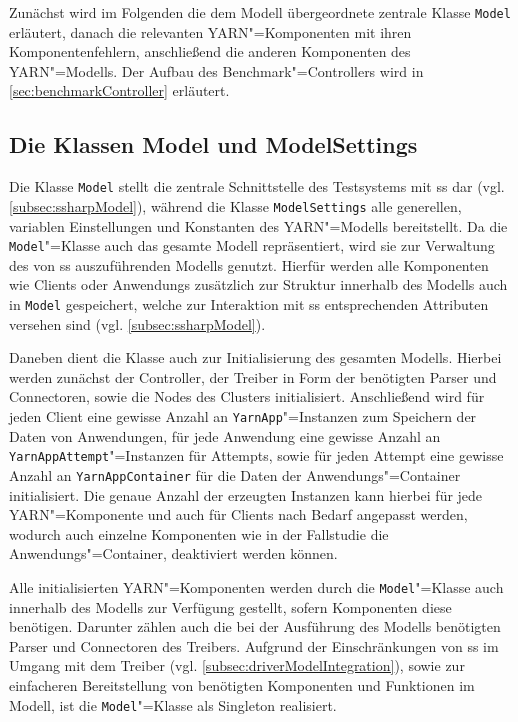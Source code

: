 Zunächst wird im Folgenden die dem Modell übergeordnete zentrale Klasse \texttt{Model} erläutert, danach die relevanten \gls{YARN}"=Komponenten mit ihren Komponentenfehlern, anschließend die anderen Komponenten des \gls{YARN}"=Modells.
Der Aufbau des Benchmark"=Controllers wird in \cref{sec:benchmarkController} erläutert.

\subsection{Die Klassen Model und ModelSettings}
\label{subsec:modelClass}

Die Klasse \texttt{Model} stellt die zentrale Schnittstelle des Testsystems mit \gls{ss} dar (vgl. \cref{subsec:ssharpModel}), während die Klasse \texttt{ModelSettings} alle generellen, variablen Einstellungen und Konstanten des \gls{YARN}"=Modells bereitstellt.
Da die \texttt{Model}"=Klasse auch das gesamte Modell repräsentiert, wird sie zur Verwaltung des von \gls{ss} auszuführenden Modells genutzt.
Hierfür werden alle Komponenten wie Clients oder \glspl{Anwendung} zusätzlich zur Struktur innerhalb des Modells auch in \texttt{Model} gespeichert, welche zur Interaktion mit \gls{ss} entsprechenden Attributen versehen sind (vgl. \cref{subsec:ssharpModel}).

Daneben dient die Klasse auch zur Initialisierung des gesamten Modells.
Hierbei werden zunächst der Controller, der Treiber in Form der benötigten Parser und Connectoren, sowie die Nodes des Clusters initialisiert.
Anschließend wird für jeden Client eine gewisse Anzahl an \texttt{YarnApp}"=Instanzen zum Speichern der Daten von Anwendungen, für jede \gls{Anwendung} eine gewisse Anzahl an \texttt{YarnAppAttempt}"=Instanzen für Attempts, sowie für jeden \gls{Attempt} eine gewisse Anzahl an \texttt{YarnAppContainer} für die Daten der Anwendungs"=Container initialisiert.
Die genaue Anzahl der erzeugten Instanzen kann hierbei für jede \gls{YARN}"=Komponente und auch für Clients nach Bedarf angepasst werden, wodurch auch einzelne Komponenten wie \zB in der Fallstudie die Anwendungs"=Container, deaktiviert werden können.

Alle initialisierten \gls{YARN}"=Komponenten werden durch die \texttt{Model}"=Klasse auch innerhalb des Modells zur Verfügung gestellt, sofern Komponenten diese benötigen.
Darunter zählen auch die bei der Ausführung des Modells benötigten Parser und Connectoren des Treibers.
Aufgrund der Einschränkungen von \gls{ss} im Umgang mit dem Treiber (vgl. \cref{subsec:driverModelIntegration}), sowie zur einfacheren Bereitstellung von benötigten Komponenten und Funktionen im Modell, ist die \texttt{Model}"=Klasse als Singleton realisiert.

